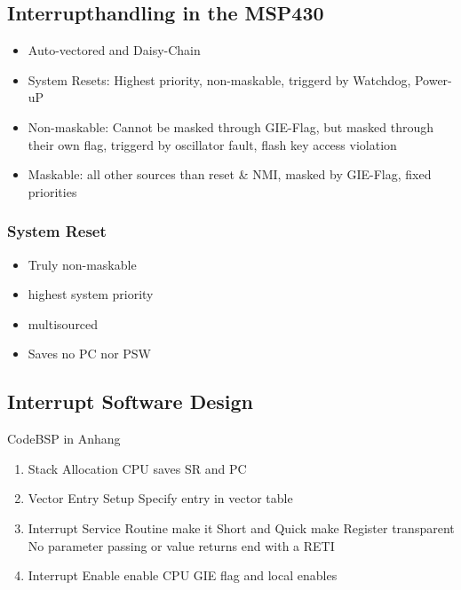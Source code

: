 \subsection{Interrupthandling in the MSP430 }
\begin{itemize}
    \item Auto-vectored and Daisy-Chain
    \item System Resets: Highest priority, non-maskable, triggerd by Watchdog, Power-uP
    \item Non-maskable: Cannot be masked through \acs{GIE}-Flag, but masked through their own flag, triggerd by oscillator fault, flash key access violation
    \item Maskable: all other sources than reset \& \acs{NMI}, masked by \acs{GIE}-Flag, fixed priorities
\end{itemize}
\subsubsection{System Reset }
    \begin{itemize}
        \item Truly non-maskable
        \item highest system priority
        \item multisourced
        \item Saves no \acs{PC} nor \acs{PSW}
    \end{itemize}

\subsection{Interrupt Software Design }
    CodeBSP in Anhang \label{InterruptC}
    \begin{enumerate}
        \item Stack Allocation\newline
            \acs{CPU} saves \acs{SR} and \acs{PC}
        \item Vector Entry Setup\newline
            Specify entry in vector table 
        \item Interrupt Service Routine\newline
            make it Short and Quick\newline
            make Register transparent \newline
            No parameter passing or value returns\newline
            end with a \acs{RETI}
        \item Interrupt Enable\newline
            enable \acs{CPU} \acs{GIE} flag and local enables
    \end{enumerate}
\clearpage

